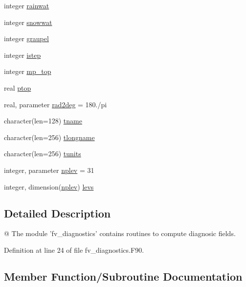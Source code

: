 \begin{DoxyCompactItemize}
\item 
integer \hyperlink{classfv__diagnostics__mod_a732b3c99ea8fce56be8203d5f7c4967e}{rainwat}
\item 
integer \hyperlink{classfv__diagnostics__mod_ab584717500f6b11a4e8e05004fa67eb2}{snowwat}
\item 
integer \hyperlink{classfv__diagnostics__mod_abaf055458b50aae94a987c4310f35a5e}{graupel}
\item 
integer \hyperlink{classfv__diagnostics__mod_a78074a36a0582f24298d249ee246b208}{istep}
\item 
integer \hyperlink{classfv__diagnostics__mod_ab88b207f7720c56604f62951e3d1eaba}{mp\-\_\-top}
\item 
real \hyperlink{classfv__diagnostics__mod_a204725397c8bd4f7f35ef71493dd144e}{ptop}
\item 
real, parameter \hyperlink{classfv__diagnostics__mod_a32c755e2c70bf36c5ad6f2c862673a32}{rad2deg} = 180./pi
\item 
character(len=128) \hyperlink{classfv__diagnostics__mod_af9092a94358dfd8005aebdb1df3977ed}{tname}
\item 
character(len=256) \hyperlink{classfv__diagnostics__mod_a597d0a2e5b049db0b3e26531a532c2ac}{tlongname}
\item 
character(len=256) \hyperlink{classfv__diagnostics__mod_ae8b52ca6727586dd57e6d5315ca66dc0}{tunits}
\item 
integer, parameter \hyperlink{classfv__diagnostics__mod_a1d88b3620cc9d26f5c198af4e052445b}{nplev} = 31
\item 
integer, dimension(\hyperlink{classfv__diagnostics__mod_a1d88b3620cc9d26f5c198af4e052445b}{nplev}) \hyperlink{classfv__diagnostics__mod_a9d963f1ceb35a3b183f8106da0d9933c}{levs}
\end{DoxyCompactItemize}


\subsection{Detailed Description}
@ The module 'fv\-\_\-diagnostics' contains routines to compute diagnosic fields. 

Definition at line 24 of file fv\-\_\-diagnostics.\-F90.



\subsection{Member Function/\-Subroutine Documentation}
